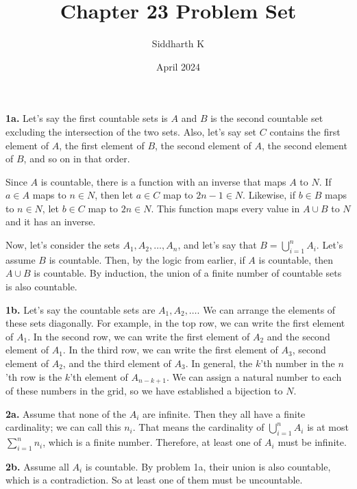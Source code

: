 \documentclass{article}
\title{Chapter 23 Problem Set}
\author{Siddharth K}
\date{April 2024}
\begin{document}
\maketitle

\textbf{1a.} Let's say the first countable sets is $A$ and $B$ is the second countable set excluding the intersection of the two sets. Also, let's say set $C$ contains the first element of $A$, the first element of $B$, the second element of $A$, the second element of $B$, and so on in that order.
\newline

Since $A$ is countable, there is a function with an inverse that maps $A$ to $N$. If $a \in A$ maps to $n \in N$, then let $a \in C$ map to $2n - 1 \in N$. Likewise, if $b\in B$ maps to $n \in N$, let $b \in C$ map to $2n \in N$. This function maps every value in $A \cup B$ to $N$ and it has an inverse.
\newline

Now, let's consider the sets $A_1, A_2,\ldots, A_n$, and let's say that $B = \bigcup_{i = 1}^n A_i$. Let's assume $B$ is countable. Then, by the logic from earlier, if $A$ is countable, then $A \cup B$ is countable. By induction, the union of a finite number of countable sets is also countable.
\newline

\textbf{1b.} Let's say the countable sets are $A_1, A_2, \ldots$. We can arrange the elements of these sets diagonally. For example, in the top row, we can write the first element of $A_1$. In the second row, we can write the first element of $A_2$ and the second element of $A_1$. In the third row, we can write the first element of $A_3$, second element of $A_2$, and the third element of $A_3$. In general, the $k$'th number in the $n$'th row is the $k$'th element of $A_{n - k + 1}$. We can assign a natural number to each of these numbers in the grid, so we have established a bijection to $N$.
\newline

\textbf{2a.} Assume that none of the $A_i$ are infinite. Then they all have a finite cardinality; we can call this $n_i$. That means the cardinality of $\bigcup_{i = 1}^n A_i$ is at most $\sum_{i = 1}^n n_i$, which is a finite number. Therefore, at least one of $A_i$ must be infinite.
\newline

\textbf{2b.} Assume all $A_i$ is countable. By problem 1a, their union is also countable, which is a contradiction. So at least one of them must be uncountable.
\newline
\end{document}
